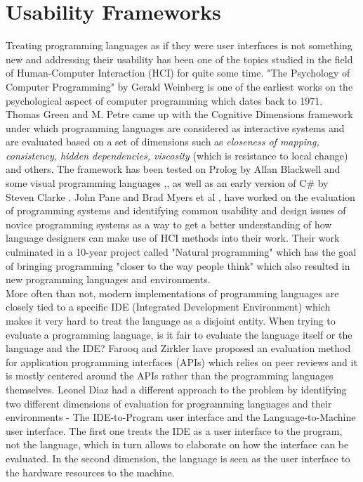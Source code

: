 \section{Usability Frameworks}
Treating programming languages as if they were user interfaces is not something new and addressing their usability has been one of the topics studied in the field of Human-Computer Interaction (HCI) for quite some time. "The Psychology of Computer Programming" by Gerald Weinberg \cite{GWeinberg} is one of the earliest works on the psychological aspect of computer programming which dates back to 1971. Thomas Green and M. Petre \cite{CognitiveDimensions} came up with the Cognitive Dimensions framework under which programming languages are considered as interactive systems and are evaluated based on a set of dimensions such as \textit{closeness of mapping, consistency, hidden dependencies, viscosity} (which is resistance to local change) and others. The framework has been tested on Prolog by Allan Blackwell \cite{CognitiveDimensions2} and some visual programming languages \cite{InstructsDescripts},\cite{InformationArtefacts},\cite{CognitiveDimensions} as well as an early version of C\# by Steven Clarke \cite{NewLangEval}. John Pane and Brad Myers et al \cite{NaturalProgramming}, have worked on the evaluation of programming systems and identifying common usability and design issues of novice programming systems as a way to get a better understanding of how language designers can make use of HCI methods into their work. Their work culminated in a 10-year project called "Natural programming" which has the goal of bringing programming "closer to the way people think" which also resulted in new programming languages and environments. 
\\More often than not, modern implementations of programming languages are closely tied to a specific IDE (Integrated Development Environment) which makes it very hard to treat the language as a disjoint entity. When trying to evaluate a programming language, is it fair to evaluate the language itself or the language and the IDE? Farooq and Zirkler \cite{APPPeer} have proposed an evaluation method for application programming interfaces (APIs) which relies on peer reviews and it is mostly centered around the APIs rather than the programming languages themselves. Leonel Diaz \cite{LangsasUI} had a different approach to the problem by identifying two different dimensions of evaluation for programming languages and their environments -  The IDE-to-Program user interface and the Language-to-Machine user interface. The first one treats the IDE as a user interface to the program, not the language, which in turn allows to elaborate on how the interface can be evaluated. In the second dimension, the language is seen as the user interface to the hardware resources to the machine.

